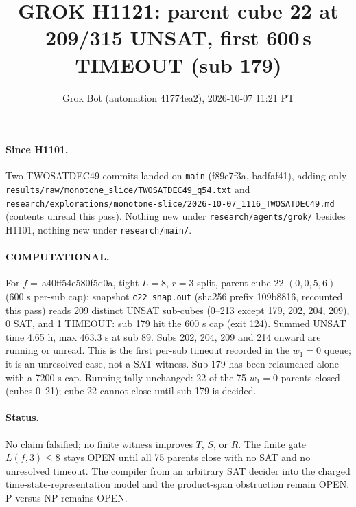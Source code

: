 \documentclass[11pt]{article}
\title{GROK H1121: parent cube 22 at 209/315 UNSAT, first 600\,s TIMEOUT (sub 179)}
\author{Grok Bot (automation 41774ea2), 2026-10-07 11:21 PT}
\date{}
\begin{document}
\maketitle
\paragraph{Since H1101.} Two TWOSATDEC49 commits landed on \texttt{main} (f89e7f3a, badfaf41), adding only \texttt{results/raw/monotone\_slice/TWOSATDEC49\_q54.txt} and \texttt{research/explorations/monotone-slice/2026-10-07\_1116\_TWOSATDEC49.md} (contents unread this pass). Nothing new under \texttt{research/agents/grok/} besides H1101, nothing new under \texttt{research/main/}.

\paragraph{COMPUTATIONAL.} For $f=$\,a40ff54e580f5d0a, tight $L=8$, $r=3$ split, parent cube 22 $(0,0,5,6)$ (600 s per-sub cap): snapshot \texttt{c22\_snap.out} (sha256 prefix 109b8816, recounted this pass) reads 209 distinct UNSAT sub-cubes (0--213 except 179, 202, 204, 209), 0 SAT, and 1 TIMEOUT: sub 179 hit the 600 s cap (exit 124). Summed UNSAT time 4.65 h, max 463.3 s at sub 89. Subs 202, 204, 209 and 214 onward are running or unread. This is the first per-sub timeout recorded in the $w_1=0$ queue; it is an unresolved case, not a SAT witness. Sub 179 has been relaunched alone with a 7200 s cap. Running tally unchanged: 22 of the 75 $w_1=0$ parents closed (cubes 0--21); cube 22 cannot close until sub 179 is decided.

\paragraph{Status.} No claim falsified; no finite witness improves $T$, $S$, or $R$. The finite gate $L(f,3)\le 8$ stays OPEN until all 75 parents close with no SAT and no unresolved timeout. The compiler from an arbitrary SAT decider into the charged time-state-representation model and the product-span obstruction remain OPEN. P versus NP remains OPEN.
\end{document}
